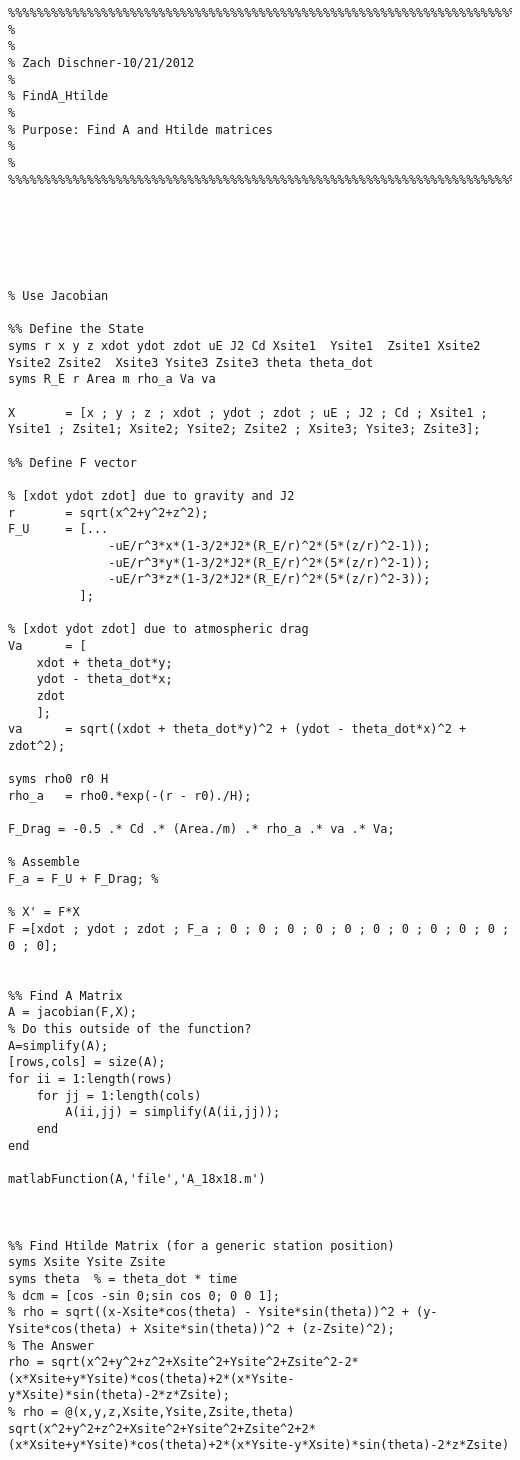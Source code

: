 \documentclass[12pt,a4paper,oneside]{article}
\numberwithin{equation}{section}   		%
\begin{document}
\begin{appendices}
\begin{lstlisting}
%%%%%%%%%%%%%%%%%%%%%%%%%%%%%%%%%%%%%%%%%%%%%%%%%%%%%%%%%%%%%%%%%%%%%%%%
% 
% 
% Zach Dischner-10/21/2012
% 
% FindA_Htilde
% 
% Purpose: Find A and Htilde matrices
% 
% 
%%%%%%%%%%%%%%%%%%%%%%%%%%%%%%%%%%%%%%%%%%%%%%%%%%%%%%%%%%%%%%%%%%%%%%%%






% Use Jacobian

%% Define the State
syms r x y z xdot ydot zdot uE J2 Cd Xsite1  Ysite1  Zsite1 Xsite2 Ysite2 Zsite2  Xsite3 Ysite3 Zsite3 theta theta_dot
syms R_E r Area m rho_a Va va 

X       = [x ; y ; z ; xdot ; ydot ; zdot ; uE ; J2 ; Cd ; Xsite1 ; Ysite1 ; Zsite1; Xsite2; Ysite2; Zsite2 ; Xsite3; Ysite3; Zsite3];

%% Define F vector

% [xdot ydot zdot] due to gravity and J2
r       = sqrt(x^2+y^2+z^2);
F_U     = [...
              -uE/r^3*x*(1-3/2*J2*(R_E/r)^2*(5*(z/r)^2-1));
              -uE/r^3*y*(1-3/2*J2*(R_E/r)^2*(5*(z/r)^2-1));
              -uE/r^3*z*(1-3/2*J2*(R_E/r)^2*(5*(z/r)^2-3));
          ];
      
% [xdot ydot zdot] due to atmospheric drag
Va      = [
    xdot + theta_dot*y;
    ydot - theta_dot*x;
    zdot
    ];
va      = sqrt((xdot + theta_dot*y)^2 + (ydot - theta_dot*x)^2 + zdot^2);

syms rho0 r0 H
rho_a   = rho0.*exp(-(r - r0)./H);

F_Drag = -0.5 .* Cd .* (Area./m) .* rho_a .* va .* Va;

% Assemble
F_a = F_U + F_Drag; % 

% X' = F*X
F =[xdot ; ydot ; zdot ; F_a ; 0 ; 0 ; 0 ; 0 ; 0 ; 0 ; 0 ; 0 ; 0 ; 0 ; 0 ; 0];
      

%% Find A Matrix
A = jacobian(F,X);
% Do this outside of the function?
A=simplify(A);
[rows,cols] = size(A);
for ii = 1:length(rows)
    for jj = 1:length(cols)
        A(ii,jj) = simplify(A(ii,jj));
    end
end

matlabFunction(A,'file','A_18x18.m')



%% Find Htilde Matrix (for a generic station position)
syms Xsite Ysite Zsite
syms theta  % = theta_dot * time
% dcm = [cos -sin 0;sin cos 0; 0 0 1];
% rho = sqrt((x-Xsite*cos(theta) - Ysite*sin(theta))^2 + (y-Ysite*cos(theta) + Xsite*sin(theta))^2 + (z-Zsite)^2);
% The Answer
rho = sqrt(x^2+y^2+z^2+Xsite^2+Ysite^2+Zsite^2-2*(x*Xsite+y*Ysite)*cos(theta)+2*(x*Ysite-y*Xsite)*sin(theta)-2*z*Zsite);
% rho = @(x,y,z,Xsite,Ysite,Zsite,theta) sqrt(x^2+y^2+z^2+Xsite^2+Ysite^2+Zsite^2+2*(x*Xsite+y*Ysite)*cos(theta)+2*(x*Ysite-y*Xsite)*sin(theta)-2*z*Zsite)


\end{lstlisting}
\end{appendices}
\end{document}
